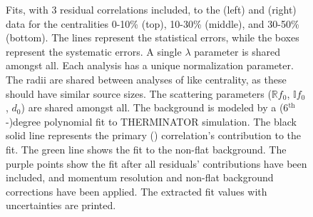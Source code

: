 \documentclass[/home/jesse/Analysis/FemtoAnalysis/AnalysisNotes/AnalysisNoteJBuxton.tex]{subfiles}
\renewcommand{\NonFlatBgdLamKs}{_NonFlatBgdCrctnLinear}
\renewcommand{\ResNum}{_3Res}
\renewcommand{\PrimMaxDecay}{_PrimMaxDecay10fm}
\renewcommand{\SaveNameModLamKs}{\MomRes\NonFlatBgdLamKs\ResNum\PrimMaxDecay\ResMethod\ParamFixAndShareLamKs}
\begin{document}
\pagestyle{empty}
\begin{landscape}

\begin{figure}[h!]
  \centering
  \caption[\LamALamKs Fits with 3 Residuals]{Fits, with 3 residual correlations included, to the \LamKs (left) and \ALamKs (right) data for the centralities 0-10\% (top), 10-30\% (middle), and 30-50\% (bottom).
 The lines represent the statistical errors, while the boxes represent the systematic errors.
 A single $\lambda$ parameter is shared amongst all.
 Each analysis has a unique normalization parameter.
 The radii are shared between analyses of like centrality, as these should have similar source sizes.
 The scattering parameters ($\mathbb{R}f_{0}$, $\mathbb{I}f_{0}$, $d_{0}$) are shared amongst all.
 The background is modeled by a (6$^{\mathrm{th}}$-)degree polynomial fit to THERMINATOR simulation.
 The black solid line represents the primary (\LamK) correlation's contribution to the fit.  
 The green line shows the fit to the non-flat background.
 The purple points show the fit after all residuals' contributions have been included, and momentum resolution and non-flat background corrections have been applied.
 The extracted fit values with uncertainties are printed.}
  \label{fig:LamK0wConjFits_3Res}
\end{figure}




\end{landscape}
\end{document}

